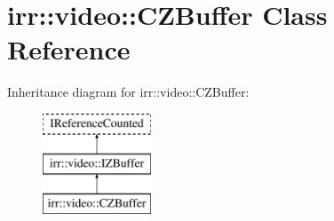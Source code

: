 \hypertarget{classirr_1_1video_1_1_c_z_buffer}{\section{irr\-:\-:video\-:\-:C\-Z\-Buffer Class Reference}
\label{classirr_1_1video_1_1_c_z_buffer}
}
Inheritance diagram for irr\-:\-:video\-:\-:C\-Z\-Buffer\-:\begin{figure}[H]
\begin{center}
\leavevmode
\includegraphics[height=3.000000cm]{classirr_1_1video_1_1_c_z_buffer}
\end{center}
\end{figure}
